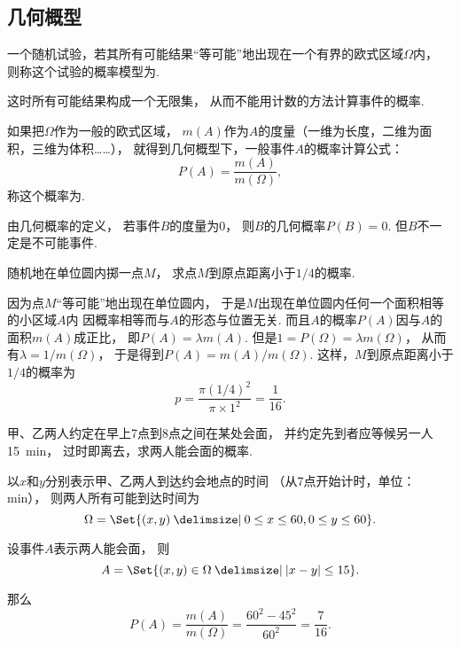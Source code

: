 \subsection{几何概型}
\begin{definition}
一个随机试验，若其所有可能结果“等可能”地出现在一个有界的欧式区域\(\Omega\)内，
则称这个试验的概率模型为.
\end{definition}
这时所有可能结果构成一个无限集，
从而不能用计数的方法计算事件的概率.

\begin{definition}
如果把\(\Omega\)作为一般的欧式区域，
\(m(A)\)作为\(A\)的度量（一维为长度，二维为面积，三维为体积……），
就得到几何概型下，一般事件\(A\)的概率计算公式：\[
	P(A) = \frac{m(A)}{m(\Omega)},
\]
称这个概率为.
\end{definition}
由几何概率的定义，
若事件\(B\)的度量为0，
则\(B\)的几何概率\(P(B)=0\).
但\(B\)不一定是不可能事件.

\begin{example}
随机地在单位圆内掷一点\(M\)，
求点\(M\)到原点距离小于\(1/4\)的概率.
\begin{solution}
因为点\(M\)“等可能”地出现在单位圆内，
于是\(M\)出现在单位圆内任何一个面积相等的小区域\(A\)内
因概率相等而与\(A\)的形态与位置无关.
而且\(A\)的概率\(P(A)\)因与\(A\)的面积\(m(A)\)成正比，
即\(P(A)=\lambda m(A)\).
但是\(1 = P(\Omega) = \lambda m(\Omega)\)，
从而有\(\lambda = 1/m(\Omega)\)，
于是得到\(P(A) = m(A)/m(\Omega)\).
这样，\(M\)到原点距离小于\(1/4\)的概率为\[
	p = \frac{\pi (1/4)^2}{\pi \times 1^2} = \frac{1}{16}.
\]
\end{solution}
\end{example}

\begin{example}[会面问题]
甲、乙两人约定在早上7点到8点之间在某处会面，
并约定先到者应等候另一人15~min，
过时即离去，求两人能会面的概率.
\begin{solution}
以\(x\)和\(y\)分别表示甲、乙两人到达约会地点的时间
（从7点开始计时，单位：min），
则两人所有可能到达时间为\[
	\Omega = \Set{ (x,y) \given 0 \leq x \leq 60, 0 \leq y \leq 60 }.
\]

设事件\(A\)表示两人能会面，
则\[
	A = \Set{ (x,y)\in\Omega \given \abs{x-y} \leq 15 }.
\]

那么\[
	P(A) = \frac{m(A)}{m(\Omega)}
	= \frac{60^2 - 45^2}{60^2}
	= \frac{7}{16}.
\]
\end{solution}
\end{example}

